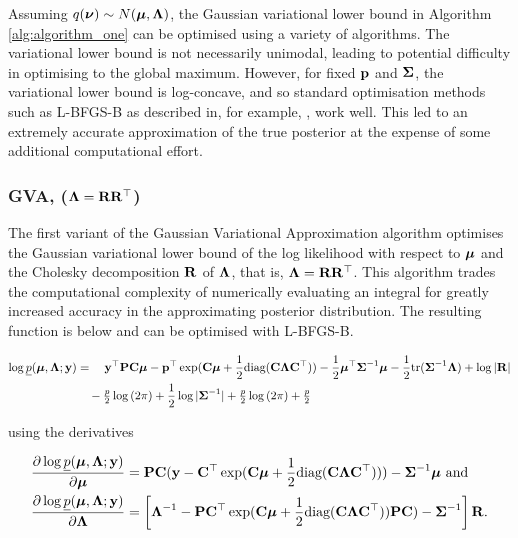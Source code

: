 \documentclass{article}[12pt]
\begin{document}

Assuming $q({\boldsymbol \nu}) \sim N({\boldsymbol \mu}, {\boldsymbol \Lambda})$, the Gaussian variational lower bound in Algorithm
\ref{alg:algorithm_one} can be optimised using a variety of algorithms. The variational lower bound is not
necessarily unimodal, leading to potential difficulty in optimising to the global maximum. However, for fixed
${\bf p}$ and ${\boldsymbol \Sigma}$, the variational lower bound is log-concave, and so standard optimisation methods such as
L-BFGS-B as described in, for example, \cite{Liu1989}, work well. This led to an extremely accurate
approximation of the true posterior at the expense of some additional computational effort.

\subsubsection{GVA, (${\boldsymbol \Lambda} = {\bf R} {\bf R}^\top$)}

The first variant of the Gaussian Variational Approximation algorithm optimises the Gaussian variational lower
bound of the log likelihood with respect to ${\boldsymbol \mu}$ and the Cholesky decomposition ${\bf R}$ of ${\boldsymbol \Lambda}$, that
is, ${\boldsymbol \Lambda} = {\bf R} {\bf R}^\top$. This algorithm trades the computational complexity of numerically evaluating an
integral for greatly increased accuracy in the approximating posterior distribution. The resulting function is
below and can be optimised with L-BFGS-B.

\begin{align*}
\log \underline{p}({\boldsymbol \mu}, {\boldsymbol \Lambda}; {\bf y}) &= \quad {\bf y}^\top{\bf P} {\bf C} {\boldsymbol\mu} - {\bf p}^\top \exp({\bf C} {\boldsymbol \mu} + {\frac{1}{2}} \text{diag}({\bf C} {\boldsymbol \Lambda} {\bf C}^\top)) - {\frac{1}{2}} {\boldsymbol \mu}^\top {\boldsymbol\Sigma}^{-1} {\boldsymbol \mu} - {\frac{1}{2}} \text{tr}{({\boldsymbol\Sigma}^{-1} {\boldsymbol\Lambda})} + \log{|{\bf R}|} \\
&\quad - \tfrac{p}{2} \log{(2 \pi)} + {\frac{1}{2}} \log{|{\boldsymbol\Sigma}^{-1}|} + \tfrac{p}{2} \log{(2 \pi)} + \tfrac{p}{2} \\
\end{align*}

using the derivatives

\begin{align*}
\frac{\partial \log \underline{p}({\boldsymbol \mu}, {\boldsymbol \Lambda}; {\bf y})}{\partial {\boldsymbol\mu}} &= {\bf P} {\bf C} ({\bf y} - {\bf C}^\top \exp({\bf C} {\boldsymbol \mu} + {\frac{1}{2}} \text{diag}{({\bf C}{\boldsymbol\Lambda}{\bf C}^\top)})) - {\boldsymbol \Sigma}^{-1} {\boldsymbol \mu} \text{ and}\\
\frac{\partial \log \underline{p}({\boldsymbol \mu}, {\boldsymbol \Lambda}; {\bf y})}{\partial {\boldsymbol\Lambda}} &= \left [{\boldsymbol \Lambda}^{-1} - {\bf P} {\bf C}^\top \exp({\bf C} {\boldsymbol \mu} + {\frac{1}{2}} \text{diag}({\bf C} {\boldsymbol \Lambda} {\bf C}^\top)) {\bf P} {\bf C}) - {\boldsymbol \Sigma}^{-1} \right ] {\bf R}.
\end{align*}
\end{document}
